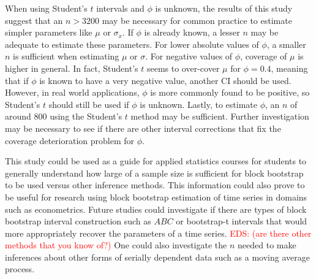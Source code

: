 \documentclass[12pt, letterpaper, titlepage]{article}
\newcommand{\eds}[1]{\textcolor{red}{EDS: (#1)}}
\begin{document}
When using Student's $t$ intervals and $\phi$ is
unknown, the results of this study suggest that an $n > 3200$ may be
necessary for common practice to estimate simpler parameters like $\mu$ 
or $\sigma_x$. If $\phi$ is already known, a lesser $n$ may be adequate
to
estimate these parameters. For lower absolute values of $\phi$, a smaller
$n$ is sufficient when estimating $\mu$ or $\sigma$. For negative
values of $\phi$, coverage of $\mu$ is higher in general. In fact, 
Student's $t$ seems to over-cover $\mu$ for $\phi = 0.4$, 
meaning that if $\phi$ is known to have a very negative value, another CI
should be used.
However, in real world applications, $\phi$ is
more commonly found to be positive, so Student's $t$ should still be used
if $\phi$ is unknown.
Lastly, to estimate $\phi$, an $n$ of around $800$ using the 
Student's $t$ method
 may be sufficient.
Further investigation may be necessary to see if there are other interval
corrections that fix the coverage deterioration problem for $\phi$.

This study could be used as a guide for applied statistics courses for students
to generally understand how large of a sample size is sufficient for block
bootstrap to be used versus other inference methods.
This information could also prove to be useful for research using block
bootstrap
estimation of time series in domains such as econometrics. Future studies
could investigate if there are types of block bootstrap interval
construction such as $ABC$ or bootstrap-t intervals
that would more appropriately recover the parameters of a time
series. \eds{are there other methods that you know of?} 
One could also investigate the $n$ needed to make inferences about
other forms of serially dependent data such as a moving average process. 



\end{document}
